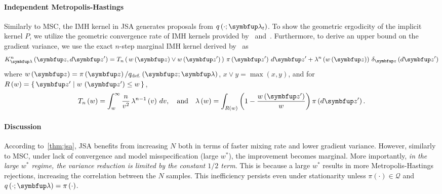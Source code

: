 \paragraph{Independent Metropolis-Hastings}
Similarly to MSC, the IMH kernel in JSA generates proposals from \(q\left(\cdot; \vlambda_t\right)\).
To show the geometric ergodicity of the implicit kernel \(P\), we utilize the geometric convergence rate of IMH kernels provided by~\citet[Theorem 2.1]{10.2307/2242610} and~\citet{wang_exact_2020}.
Furthermore, to derive an upper bound on the gradient variance, we use the exact \(n\)-step marginal IMH kernel derived by~\citet{Smith96exacttransition} as
{%
  \begin{align}
  K^n_{\vlambda}\left(\vz, d\vz^{\prime}\right) 
  = T_n\left(\, w\left(\vz\right) \vee w\left(\vz^{\prime}\right)\,\right) \, \pi\left(\vz^{\prime}\right) \, d\vz^{\prime}
  + \lambda^n\left(w\left(\vz\right)\right) \, \delta_{\vz}\left(d\vz^{\prime}\right)
  \label{eq:imh_exact_kernel}
  \end{align}
}%
where {\(w\left(\vz\right) = \pi\left(\vz\right)/q_{\text{def.}}\left(\vz; \vlambda\right)\), \(x \vee y = \max\left(x, y\right)\)}, and for {\(R\left(w\right) = \{\, \vz^{\prime} \mid w\,\left(\vz^{\prime}\right) \leq w \,\}\)}, 
{%
  \begin{align}
    T_n\left(w\right)      = \int_w^{\infty}
    \frac{n}{v^2}
    \, \lambda^{n-1}\left(v\right)\,dv,
    \quad\text{and}\quad
    \lambda\left(w\right) =
    \int_{R\left(w\right)}
    \left( 1 - \frac{w\left(\vz^{\prime}\right)}{w}  \right)
    \pi\left(d\vz^{\prime}\right).\label{eq:T_lambda}
  \end{align}
}%


%
\vspace{-0.05in}
\paragraph{Discussion}
According to~\cref{thm:jsa}, JSA benefits from increasing \(N\) both in terms of faster mixing rate and lower gradient variance.
However, similarly to MSC, under lack of convergence and model misspecification (large \(w^*\)), the improvement becomes marginal.
More importantly, \textit{in the large \(w^*\) regime, the variance reduction is limited by the constant \(1/2\) term}.
This is because a large \(w^*\) results in more Metropolis-Hastings rejections, increasing the correlation between the \(N\) samples.
This inefficiency persists even under stationarity unless \(\pi\left(\cdot\right) \in \mathcal{Q}\) and \(q\left(\cdot; \vlambda\right) = \pi\left(\cdot\right)\).


